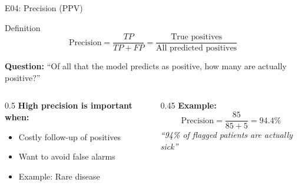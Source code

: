 \documentclass[aspectratio=169, 10pt]{beamer}
\begin{document}
\begin{frame}{E04: Precision (PPV)}
    
    \begin{block}{Definition}
        \[
        \text{Precision} = \frac{TP}{TP + FP} = \frac{\text{True positives}}{\text{All predicted positives}}
        \]
    \end{block}
    
    \vspace{3mm}
    
    \textbf{Question:} ``Of all that the model predicts as positive, how many are actually positive?''
    
    \vspace{3mm}
    
    \begin{columns}
        \begin{column}{0.5\textwidth}
            \textbf{High precision is important when:}
            \begin{itemize}
                \item Costly follow-up of positives
                \item Want to avoid false alarms
                \item Example: Rare disease
            \end{itemize}
        \end{column}
        
        \begin{column}{0.45\textwidth}
            \textbf{Example:}
            \[
            \text{Precision} = \frac{85}{85 + 5} = 94.4\%
            \]
            \footnotesize\textit{``94\% of flagged patients are actually sick''}
        \end{column}
    \end{columns}
    
\end{frame}
\end{document}

